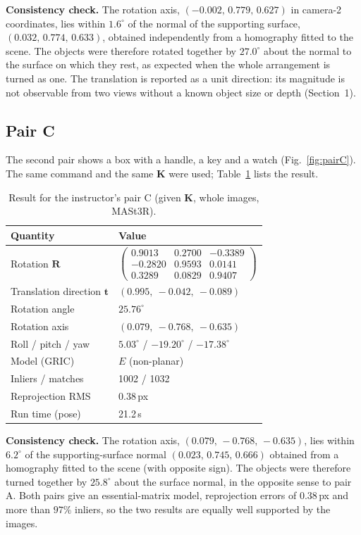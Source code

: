 \documentclass[10pt,a4paper,twocolumn]{article}
\newcommand{\R}{\mathbf{R}}
\newcommand{\tv}{\mathbf{t}}
\newcommand{\K}{\mathbf{K}}
\begin{document}
\textbf{Consistency check.} The rotation axis, $(-0.002,\,0.779,\,0.627)$ in camera-2 coordinates, lies within $1.6^\circ$ of the normal of the supporting surface, $(0.032,\,0.774,\,0.633)$, obtained independently from a homography fitted to the scene. The objects were therefore rotated together by $27.0^\circ$ about the normal to the surface on which they rest, as expected when the whole arrangement is turned as one. The translation is reported as a unit direction: its magnitude is not observable from two views without a known object size or depth (Section~1).

\subsection*{Pair C}
The second pair shows a box with a handle, a key and a watch (Fig.~\ref{fig:pairC}). The same command and the same $\K$ were used; Table~\ref{tab:pairC} lists the result.

\begin{table}[!htbp]
\centering\footnotesize\setlength{\tabcolsep}{4pt}
\begin{tabular}{ll}
\toprule
Quantity & Value\\
\midrule
Rotation $\R$ & $\begin{pmatrix}0.9013&0.2700&-0.3389\\-0.2820&0.9593&0.0141\\0.3289&0.0829&0.9407\end{pmatrix}$\\[14pt]
Translation direction $\tv$ & $(0.995,\ -0.042,\ -0.089)$\\
Rotation angle & $25.76^\circ$\\
Rotation axis & $(0.079,\ -0.768,\ -0.635)$\\
Roll / pitch / yaw & $5.03^\circ$ / $-19.20^\circ$ / $-17.38^\circ$\\
Model (GRIC) & $E$ (non-planar)\\
Inliers / matches & 1002 / 1032\\
Reprojection RMS & 0.38\,px\\
Run time (pose) & 21.2\,s\\
\bottomrule
\end{tabular}
\caption{Result for the instructor's pair C (given $\K$, whole images, MASt3R).}\label{tab:pairC}
\end{table}


\textbf{Consistency check.} The rotation axis, $(0.079,\,-0.768,\,-0.635)$, lies within $6.2^\circ$ of the supporting-surface normal $(0.023,\,0.745,\,0.666)$ obtained from a homography fitted to the scene (with opposite sign). The objects were therefore turned together by $25.8^\circ$ about the surface normal, in the opposite sense to pair A. Both pairs give an essential-matrix model, reprojection errors of $0.38$\,px and more than $97\%$ inliers, so the two results are equally well supported by the images.
\end{document}
